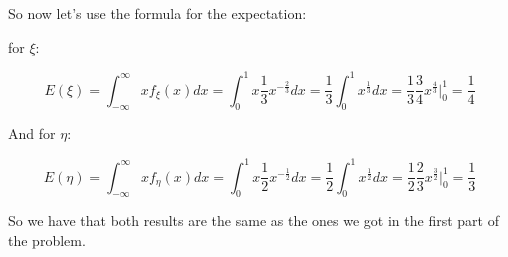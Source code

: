 So now let's use the formula for the expectation:

for $\xi$:

\begin{equation*}
    E(\xi) = \int_{-\infty}^{\infty} x f_\xi(x) dx = \int_{0}^{1} x \frac{1}{3} x^{-\frac{2}{3}} dx = \frac{1}{3} \int_{0}^{1} x^{\frac{1}{3}} dx = \frac{1}{3} \frac{3}{4} x^{\frac{4}{3}} \Big|_{0}^{1} = \frac{1}{4}
\end{equation*}

And for $\eta$:

\begin{equation*}
    E(\eta) = \int_{-\infty}^{\infty} x f_\eta(x) dx = \int_{0}^{1} x \frac{1}{2} x^{-\frac{1}{2}} dx = \frac{1}{2} \int_{0}^{1} x^{\frac{1}{2}} dx = \frac{1}{2} \frac{2}{3} x^{\frac{3}{2}} \Big|_{0}^{1} = \frac{1}{3}
\end{equation*}

So we have that both results are the same as the ones we got in the first part of the problem.
